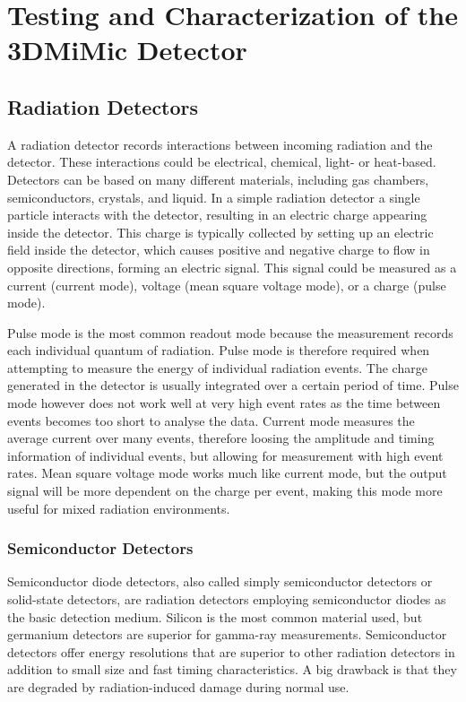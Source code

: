 \documentclass[../main/thesis.tex]{subfiles}
\begin{document}
\newpage
\chapter{Testing and Characterization of the 3DMiMic Detector}
\label{3dmimic}

\section{Radiation Detectors}
\label{t-detector}
A radiation detector records interactions between incoming radiation and the detector. These interactions could be electrical, chemical, light- or heat-based. Detectors can be based on many different materials, including gas chambers, semiconductors, crystals, and liquid. In a simple radiation detector a single particle interacts with the detector, resulting in an electric charge appearing inside the detector. This charge is typically collected by setting up an electric field inside the detector, which causes positive and negative charge to flow in opposite directions, forming an electric signal. This signal could be measured as a current (current mode), voltage (mean square voltage mode), or a charge (pulse mode). \citep[chap. 4]{Knoll}

Pulse mode is the most common readout mode because the measurement records each individual quantum of radiation. Pulse mode is therefore required when attempting to measure the energy of individual radiation events. The charge generated in the detector is usually integrated over a certain period of time. Pulse mode however does not work well at very high event rates as the time between events becomes too short to analyse the data. Current mode measures the average current over many events, therefore loosing the amplitude and timing information of individual events, but allowing for measurement with high event rates. Mean square voltage mode works much like current mode, but the output signal will be more dependent on the charge per event, making this mode more useful for mixed radiation environments. \citep[chap. 4]{Knoll}




\subsection{Semiconductor Detectors}
\label{t-semi}
Semiconductor diode detectors, also called simply semiconductor detectors or solid-state detectors, are radiation detectors employing semiconductor diodes as the basic detection medium. Silicon is the most common material used, but germanium detectors are superior for gamma-ray measurements. Semiconductor detectors offer energy resolutions that are superior to other radiation detectors in addition to small size and fast timing characteristics. A big drawback is that they are degraded by radiation-induced damage during normal use. \citep[chap. 11]{Knoll}
\end{document}
